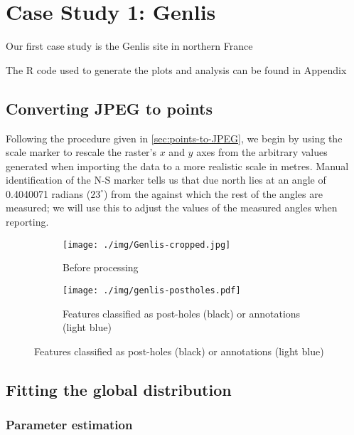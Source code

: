 \documentclass[../../ArchStats.tex]{subfiles}
\begin{document}
\section{Case Study 1: Genlis}
\label{sec:CS1}

Our first case study is the Genlis site in northern France 

The R code used to generate the plots and analysis can be found in Appendix

\subsection{Converting JPEG to points}

Following the procedure given in \ref{sec:points-to-JPEG}, we begin by using the scale marker to rescale the raster's $x$ and $y$ axes from the arbitrary values generated when importing the data to a more realistic scale in metres. Manual identification of the N-S marker tells us that due north lies at an angle of 0.4040071 radians ($23^\circ$) from the  against which the rest of the angles are measured; we will use this to adjust the values of the measured angles when reporting.

\begin{figure}
\centering
\caption{Stages of pre-processing of the Genlis site plan}
\begin{subfigure}[t]{0.45\textwidth}
\caption{Before processing}
\texttt{[image: ./img/Genlis-cropped.jpg]}
\end{subfigure}
\begin{subfigure}[t]{0.45\textwidth}
\caption{Features classified as post-holes (black) or annotations (light blue)}
\texttt{[image: ./img/genlis-postholes.pdf]}
\end{subfigure}
\end{figure}

\subsection{Fitting the global distribution}





\subsubsection{Parameter estimation}
\end{document}
